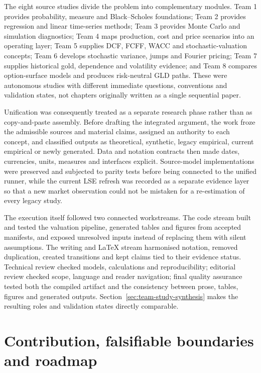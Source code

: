 The eight source studies divide the problem into complementary modules. Team 1
provides probability, measure and Black--Scholes foundations; Team 2 provides
regression and linear time-series methods; Team 3 provides Monte Carlo and
simulation diagnostics; Team 4 maps production, cost and price scenarios into
an operating layer; Team 5 supplies DCF, FCFF, WACC and stochastic-valuation
concepts; Team 6 develops stochastic variance, jumps and Fourier pricing; Team
7 supplies historical gold, dependence and volatility evidence; and Team 8
compares option-surface models and produces risk-neutral GLD paths. These were
autonomous studies with different immediate questions, conventions and
validation states, not chapters originally written as a single sequential
paper.

Unification was consequently treated as a separate research phase rather than
as copy-and-paste assembly. Before drafting the integrated argument, the work
froze the admissible sources and material claims, assigned an authority to each
concept, and classified outputs as theoretical, synthetic, legacy empirical,
current empirical or newly generated. Data and notation contracts then made
dates, currencies, units, measures and interfaces explicit. Source-model
implementations were preserved and subjected to parity tests before being
connected to the unified runner, while the current LSE refresh was recorded as
a separate evidence layer so that a new market observation could not be
mistaken for a re-estimation of every legacy study.

The execution itself followed two connected workstreams. The code stream built
and tested the valuation pipeline, generated tables and figures from accepted
manifests, and exposed unresolved inputs instead of replacing them with silent
assumptions. The writing and LaTeX stream harmonised notation, removed
duplication, created transitions and kept claims tied to their evidence status.
Technical review checked models, calculations and reproducibility; editorial
review checked scope, language and reader navigation; final quality assurance
tested both the compiled artifact and the consistency between prose, tables,
figures and generated outputs. Section~\ref{sec:team-study-synthesis} makes the
resulting roles and validation states directly comparable.

\section{Contribution, falsifiable boundaries and roadmap}

